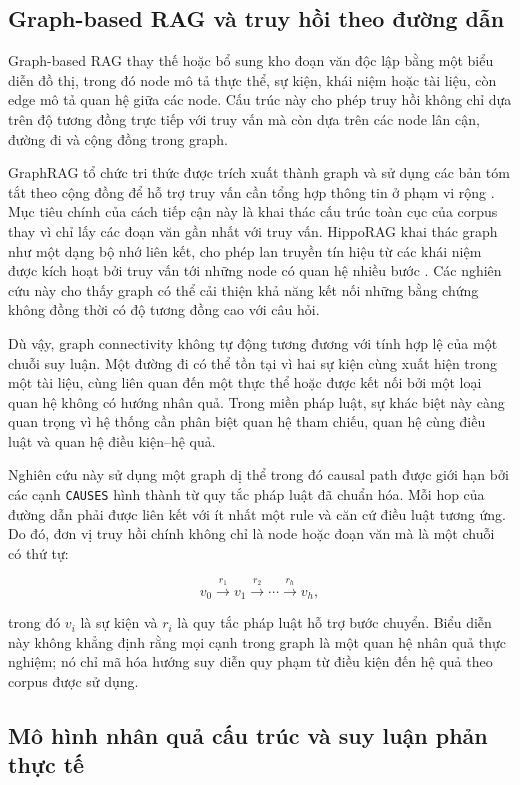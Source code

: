\subsection{Graph-based RAG và truy hồi theo đường dẫn}

Graph-based RAG thay thế hoặc bổ sung kho đoạn văn độc lập bằng một biểu
diễn đồ thị, trong đó node mô tả thực thể, sự kiện, khái niệm hoặc tài liệu,
còn edge mô tả quan hệ giữa các node. Cấu trúc này cho phép truy hồi không
chỉ dựa trên độ tương đồng trực tiếp với truy vấn mà còn dựa trên các node
lân cận, đường đi và cộng đồng trong graph.

GraphRAG tổ chức tri thức được trích xuất thành graph và sử dụng các bản tóm
tắt theo cộng đồng để hỗ trợ truy vấn cần tổng hợp thông tin ở phạm vi rộng
\cite{edge2024graphrag}. Mục tiêu chính của cách tiếp cận này là khai thác
cấu trúc toàn cục của corpus thay vì chỉ lấy các đoạn văn gần nhất với truy
vấn. HippoRAG khai thác graph như một dạng bộ nhớ liên kết, cho phép lan
truyền tín hiệu từ các khái niệm được kích hoạt bởi truy vấn tới những node
có quan hệ nhiều bước \cite{gutierrez2024hipporag}. Các nghiên cứu này cho
thấy graph có thể cải thiện khả năng kết nối những bằng chứng không đồng
thời có độ tương đồng cao với câu hỏi.

Dù vậy, graph connectivity không tự động tương đương với tính hợp lệ của
một chuỗi suy luận. Một đường đi có thể tồn tại vì hai sự kiện cùng xuất
hiện trong một tài liệu, cùng liên quan đến một thực thể hoặc được kết nối
bởi một loại quan hệ không có hướng nhân quả. Trong miền pháp luật, sự khác
biệt này càng quan trọng vì hệ thống cần phân biệt quan hệ tham chiếu, quan
hệ cùng điều luật và quan hệ điều kiện--hệ quả.

Nghiên cứu này sử dụng một graph dị thể trong đó causal path được giới hạn
bởi các cạnh \texttt{CAUSES} hình thành từ quy tắc pháp luật đã chuẩn hóa.
Mỗi hop của đường dẫn phải được liên kết với ít nhất một rule và căn cứ điều
luật tương ứng. Do đó, đơn vị truy hồi chính không chỉ là node hoặc đoạn văn
mà là một chuỗi có thứ tự:

\[
v_0 \xrightarrow{r_1} v_1
    \xrightarrow{r_2} \cdots
    \xrightarrow{r_h} v_h,
\]

trong đó \(v_i\) là sự kiện và \(r_i\) là quy tắc pháp luật hỗ trợ bước
chuyển. Biểu diễn này không khẳng định rằng mọi cạnh trong graph là một quan
hệ nhân quả thực nghiệm; nó chỉ mã hóa hướng suy diễn quy phạm từ điều kiện
đến hệ quả theo corpus được sử dụng.

\subsection{Mô hình nhân quả cấu trúc và suy luận phản thực tế}

